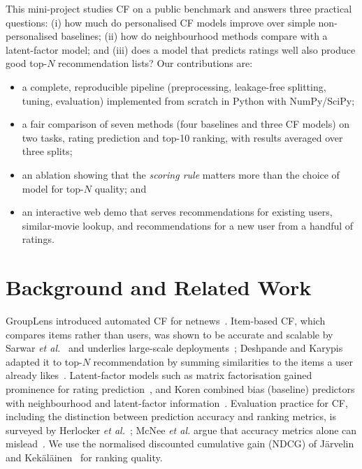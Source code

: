 \documentclass[conference]{IEEEtran}
\begin{document}
This mini-project studies CF on a public benchmark and answers three practical questions: (i) how much do personalised CF models improve over simple non-personalised baselines; (ii) how do neighbourhood methods compare with a latent-factor model; and (iii) does a model that predicts ratings well also produce good top-$N$ recommendation lists? Our contributions are:
\begin{itemize}
\item a complete, reproducible pipeline (preprocessing, leakage-free splitting, tuning, evaluation) implemented from scratch in Python with NumPy/SciPy;
\item a fair comparison of seven methods (four baselines and three CF models) on two tasks, rating prediction and top-10 ranking, with results averaged over three splits;
\item an ablation showing that the \emph{scoring rule} matters more than the choice of model for top-$N$ quality; and
\item an interactive web demo that serves recommendations for existing users, similar-movie lookup, and recommendations for a new user from a handful of ratings.
\end{itemize}

\section{Background and Related Work}
GroupLens introduced automated CF for netnews~\cite{resnick1994}. Item-based CF, which compares items rather than users, was shown to be accurate and scalable by Sarwar \emph{et al.}~\cite{sarwar2001} and underlies large-scale deployments~\cite{linden2003}; Deshpande and Karypis adapted it to top-$N$ recommendation by summing similarities to the items a user already likes~\cite{deshpande2004}. Latent-factor models such as matrix factorisation gained prominence for rating prediction~\cite{koren2009}, and Koren combined bias (baseline) predictors with neighbourhood and latent-factor information~\cite{koren2008}. Evaluation practice for CF, including the distinction between prediction accuracy and ranking metrics, is surveyed by Herlocker \emph{et al.}~\cite{herlocker2004}; McNee \emph{et al.} argue that accuracy metrics alone can mislead~\cite{mcnee2006}. We use the normalised discounted cumulative gain (NDCG) of J{\"a}rvelin and Kek{\"a}l{\"a}inen~\cite{jarvelin2002} for ranking quality.
\end{document}
